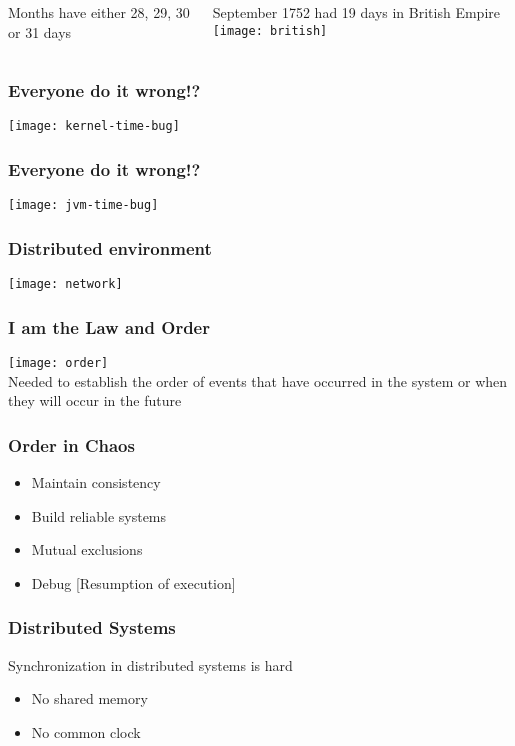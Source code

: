 \documentclass[aspectratio=169, 15pt]{beamer}
\begin{document}
{\begin{gdblank}
\begin{columns}
\begin{column}{0.70\textwidth}
				\LARGE Months have either 28, 29, 30 or 31 days
				\pause     
			\end{column}
			\begin{column}{0.3\textwidth}
				\large\centering  September 1752 had 19 days in British Empire
				\vskip0.5cm
				\texttt{[image: british]}
			\end{column}
		\end{columns}
	\end{gdblank} 
	\begin{gdblank}
		\frametitle{Everyone do it wrong!?}
	\end{gdblank}   
	\begin{gdblank}
		\texttt{[image: kernel-time-bug]}
	\end{gdblank}   
	\begin{gdblank}
		\frametitle{Everyone do it wrong!?}
		\texttt{[image: jvm-time-bug]}
	\end{gdblank}
	\begin{gdblank}
		\frametitle{Distributed environment}
		\texttt{[image: network]}
	\end{gdblank}   
	\begin{gdblank}
		\frametitle{I am the Law and Order}
		\centering
		\texttt{[image: order]}
		\\Needed to establish the order of events that have occurred in the system or when they will occur in the future
	\end{gdblank}
	\begin{gdblank}
		\frametitle{Order in Chaos}
		\LARGE
		\begin{itemize}
			\item Maintain consistency
			\item Build reliable systems
			      \pause
			\item Mutual exclusions
			\item Debug [Resumption of execution]
		\end{itemize}
	\end{gdblank}
	\begin{gdblank}
		\frametitle{Distributed Systems}
		\LARGE
		Synchronization in distributed systems is hard
		\begin{itemize}
			\item No shared memory
			\item No common clock
		\end{itemize}
	\end{gdblank}
}
\end{document}

